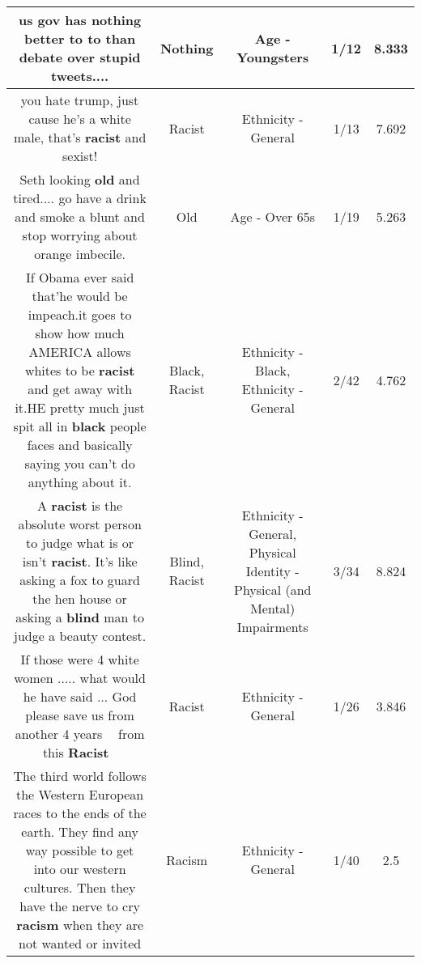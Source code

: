 \documentclass[11pt]{article}
\newlength\mylength
\begin{document}
\begin{center}
\begin{longtable}{|C{.65\mylength}|C{.30\mylength}|C{.12\mylength}|C{.12\mylength}|C{.12\mylength}|}
  \small us gov has \textbf{nothing} better to to than debate over stupid tweets....\normalsize   & Nothing & Age - Youngsters & 1/12 & 8.333 \\  \hline
  \small you hate trump, just cause he's a white male, that's \textbf{racist} and sexist!\normalsize   & Racist & Ethnicity - General & 1/13 & 7.692 \\  \hline
  \small Seth looking \textbf{old} and tired.... go have a drink and smoke a blunt and stop worrying about orange imbecile.\normalsize   & Old & Age - Over 65s & 1/19 & 5.263 \\  \hline
  \small If Obama ever said that'he would be impeach.it goes to show how much AMERICA allows whites to be \textbf{racist} and get away with it.HE pretty much just spit all in \textbf{black} people faces and basically saying you can't do anything about it.\normalsize   & Black, Racist & Ethnicity - Black, Ethnicity - General & 2/42 & 4.762 \\  \hline
  \small A \textbf{racist} is the absolute worst person to judge what is or isn't \textbf{racist}. 
It's like asking a fox to guard the hen house or asking a \textbf{blind} man to judge a beauty contest.\normalsize   & Blind, Racist & Ethnicity - General, Physical Identity - Physical (and Mental) Impairments & 3/34 & 8.824 \\  \hline
  \small If those were 4 white women ..... what would he have said ... God please save us from another 4 years 🙏🏻 from this \textbf{Racist} 🐷\normalsize   & Racist & Ethnicity - General & 1/26 & 3.846 \\  \hline
  \small The third world follows the Western European races to the ends of the earth.  They find any way possible to get into our western cultures.  Then they have the nerve to cry \textbf{racism} when they are not wanted or invited\normalsize   & Racism & Ethnicity - General & 1/40 & 2.5 \\  \hline

\end{longtable}
\end{center}
\end{document}

